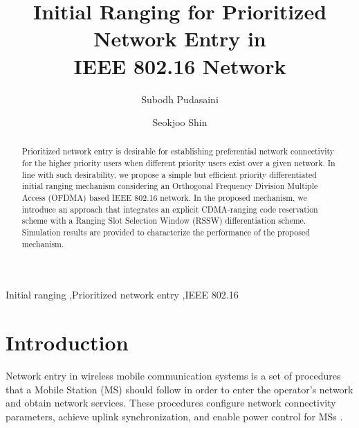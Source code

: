 \documentclass[preprint,12pt]{elsarticle}
\begin{document}
\begin{frontmatter}





\title{Initial Ranging for Prioritized Network Entry in \\IEEE 802.16 Network}



\author{Subodh Pudasaini}
\author{Seokjoo Shin}
\address{Department of Computer Engineering, Chosun University, Gwangju, Korea}



\begin{abstract}
Prioritized network entry is desirable for establishing preferential network connectivity for the higher priority users when different priority users exist over a given network. In line with such desirability, we propose a simple but efficient priority differentiated initial ranging mechanism considering an Orthogonal Frequency Division Multiple Access (OFDMA) based IEEE 802.16 network. In the proposed mechanism, we introduce an approach that integrates an explicit CDMA-ranging code reservation scheme with a Ranging Slot Selection Window (RSSW) differentiation scheme. Simulation results are provided to characterize the performance of the proposed mechanism.

\end{abstract}

\begin{keyword}

Initial ranging \sep Prioritized network entry \sep IEEE 802.16




\end{keyword}

\end{frontmatter}

\linenumbers


\section{Introduction}
Network entry in wireless mobile communication systems is a set of procedures that a Mobile Station (MS) should follow in order to enter the operator's network and obtain network services. These procedures configure network connectivity parameters, achieve uplink synchronization, and enable power control for MSs \cite{Ahmadi} \cite{Taha} \cite{Andrews}.
\end{document}
